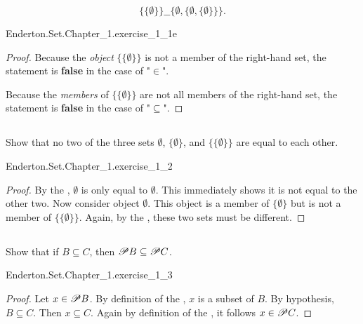 \documentclass{report}
\begin{document}
  $$\{\{\emptyset\}\} \_\_ \{\emptyset, \{\emptyset, \{\emptyset\}\}\}.$$

    {Enderton.Set.Chapter\_1.exercise\_1\_1e}

  \begin{proof}
    Because the \textit{object} $\{\{\emptyset\}\}$ is not a member of the
      right-hand set, the statement is \textbf{false} in the case of "$\in$".

    Because the \textit{members} of $\{\{\emptyset\}\}$ are not all members of
      the right-hand set, the statement is \textbf{false} in the case of
      "$\subseteq$".
  \end{proof}

\subsection{}%

  Show that no two of the three sets $\emptyset$, $\{\emptyset\}$, and
    $\{\{\emptyset\}\}$ are equal to each other.

    {Enderton.Set.Chapter\_1.exercise\_1\_2}

  \begin{proof}
    By the , $\emptyset$ is only equal to
      $\emptyset$.
    This immediately shows it is not equal to the other two.
    Now consider object $\emptyset$.
    This object is a member of $\{\emptyset\}$ but is not a member of
      $\{\{\emptyset\}\}$.
    Again, by the , these two sets must be
      different.
  \end{proof}

\subsection{}%

  Show that if $B \subseteq C$, then $\mathscr{P}B \subseteq \mathscr{P}C$.

    {Enderton.Set.Chapter\_1.exercise\_1\_3}

  \begin{proof}
    Let $x \in \mathscr{P}B$.
    By definition of the , $x$ is a subset of $B$.
    By hypothesis, $B \subseteq C$.
    Then $x \subseteq C$.
    Again by definition of the , it follows
      $x \in \mathscr{P}C$.
  \end{proof}
\end{document}
